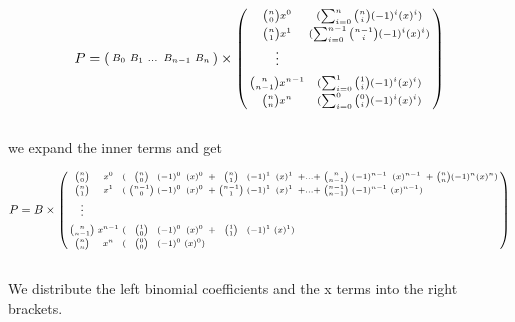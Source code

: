 \begin{equation*}
    P=
    \begin{psmallmatrix*}
        B_0 & B_1 & \dots & B_{n-1} & B_{n}
    \end{psmallmatrix*}
    \times
    \begin{psmallmatrix}
        {n \choose 0}x^0       & ( \sum_{i = 0}^{n}   {n \choose i}    (-1)^{i}  (x)^{i}) \\
        {n \choose 1}x^1       & ( \sum_{i = 0}^{n-1} {n-1 \choose i}  (-1)^{i}  (x)^{i}) \\
        \vdots                                                                            \\
        & \\
        {n \choose n-1}x^{n-1} & ( \sum_{i = 0}^{1}   {1 \choose i}    (-1)^{i}  (x)^{i}) \\
        {n \choose n}x^n       & ( \sum_{i = 0}^{0}   {0 \choose i}    (-1)^{i}  (x)^{i})
    \end{psmallmatrix}
\end{equation*} 
\\
we expand the inner terms and get

\begin{gather*}
    P=B \times
    \begin{psmallmatrix}
        {n \choose 0}   & x^0     & ( & {n \choose 0}   & (-1)^{0} & (x)^{0}  & + & {n \choose 1}   & (-1)^{1} & (x)^{1}  & + \hdots + & {n \choose n-1}   & (-1)^{n-1} & (x)^{n-1}   & + & {n \choose n} (-1)^{n} (x)^{n}) \\
        {n \choose 1}   & x^1     & ( & {n-1 \choose 0} & (-1)^{0} & (x)^{0}  & + & {n-1 \choose 1} & (-1)^{1} & (x)^{1}  & + \hdots + & {n-1 \choose n-1} & (-1)^{n-1} & (x)^{n-1} )                                       \\
        \vdots                                                                                                                                                                                                              \\
        & \\
        {n \choose n-1} & x^{n-1} & ( & {1 \choose 0}   & (-1)^{0} & (x)^{0}  & + & {1 \choose 1}   & (-1)^{1} & (x)^{1})                                                                                                   \\
        {n \choose n}   & x^n     & ( & {0 \choose 0}   & (-1)^{0} & (x)^{0})                                                                                                                                               \\
    \end{psmallmatrix}
\end{gather*}
\\
We distribute the left binomial coefficients and the x terms into the right brackets.

